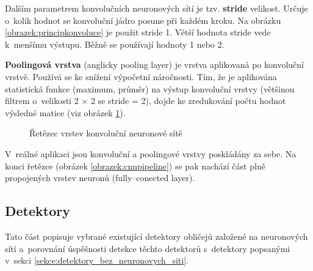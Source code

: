 Dalším parametrem konvolučních neuronových sítí je tzv. \textbf{stride} velikost. Určuje o~kolik hodnot se konvoluční jádro posune při každém kroku. Na obrázku \ref{obrazek:principkonvoluce} je použit stride 1. Větší hodnota stride vede k~menšímu výstupu. Běžně se používají hodnoty 1 nebo 2.

\textbf{Poolingová vrstva} (anglicky pooling layer) je vrstva aplikovaná po konvoluční vrstvě. Používá se ke snížení výpočetní náročnosti. Tím, že je aplikována statistická funkce (maximum, průměr) na výstup konvoluční vrstvy (většinou filtrem o~velikosti 2 $\times$ 2 se stride = 2), dojde ke zredukování počtu hodnot výsledné matice (viz obrázek \ref{obrazek:cnnpooling}).

\begin{figure}[H]
  \begin{center}
  \label{obrazek:cnnpooling}
  \caption{Řetězec vrstev konvoluční neuronové sítě \cite{cnnCv}}
  \end{center}
\end{figure}

V~reálné aplikaci jsou konvoluční a poolingové vrstvy poskládány za sebe. Na konci řetězce (obrázek \ref{obrazek:cnnpipeline}) se pak nachází část plně propojených vrstev neuronů (fully--conected layer).

\subsection*{Detektory}
Tato část popisuje vybrané existující detektory obličejů založené na neuronových sítí a~porovnání úspěšnosti detekce těchto detektorů s~detektory popsanými v~sekci \ref{sekce:detektory_bez_neuronovych_siti}.

